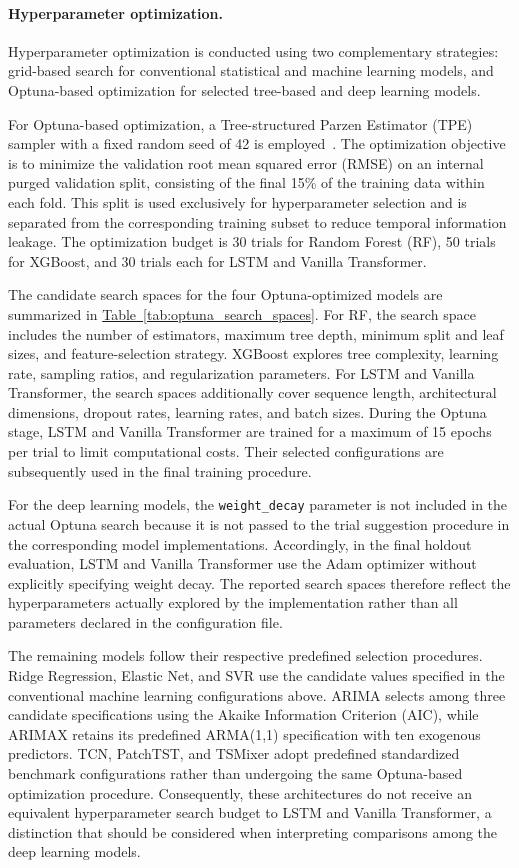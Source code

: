 \documentclass[12pt,twoside]{ord}
\begin{document}
\paragraph{Hyperparameter optimization.} Hyperparameter optimization is conducted using two complementary strategies: grid-based search for conventional statistical and machine learning models, and Optuna-based optimization for selected tree-based and deep learning models.

For Optuna-based optimization, a Tree-structured Parzen Estimator (TPE) sampler with a fixed random seed of 42 is employed~\cite{akiba2019}. The optimization objective is to minimize the validation root mean squared error (RMSE) on an internal purged validation split, consisting of the final 15\% of the training data within each fold. This split is used exclusively for hyperparameter selection and is separated from the corresponding training subset to reduce temporal information leakage. The optimization budget is 30 trials for Random Forest (RF), 50 trials for XGBoost, and 30 trials each for LSTM and Vanilla Transformer.

The candidate search spaces for the four Optuna-optimized models are summarized in \hyperref[tab:optuna_search_spaces]{Table~\ref*{tab:optuna_search_spaces}}. For RF, the search space includes the number of estimators, maximum tree depth, minimum split and leaf sizes, and feature-selection strategy. XGBoost explores tree complexity, learning rate, sampling ratios, and regularization parameters. For LSTM and Vanilla Transformer, the search spaces additionally cover sequence length, architectural dimensions, dropout rates, learning rates, and batch sizes. During the Optuna stage, LSTM and Vanilla Transformer are trained for a maximum of 15 epochs per trial to limit computational costs. Their selected configurations are subsequently used in the final training procedure.

For the deep learning models, the \texttt{weight\_decay} parameter is not included in the actual Optuna search because it is not passed to the trial suggestion procedure in the corresponding model implementations. Accordingly, in the final holdout evaluation, LSTM and Vanilla Transformer use the Adam optimizer without explicitly specifying weight decay. The reported search spaces therefore reflect the hyperparameters actually explored by the implementation rather than all parameters declared in the configuration file.

The remaining models follow their respective predefined selection procedures. Ridge Regression, Elastic Net, and SVR use the candidate values specified in the conventional machine learning configurations above. ARIMA selects among three candidate specifications using the Akaike Information Criterion (AIC), while ARIMAX retains its predefined ARMA(1,1) specification with ten exogenous predictors. TCN, PatchTST, and TSMixer adopt predefined standardized benchmark configurations rather than undergoing the same Optuna-based optimization procedure. Consequently, these architectures do not receive an equivalent hyperparameter search budget to LSTM and Vanilla Transformer, a distinction that should be considered when interpreting comparisons among the deep learning models.
\end{document}
